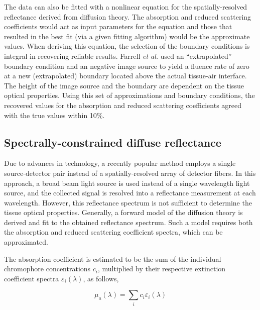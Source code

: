 The data can also be fitted with a nonlinear equation for the spatially-resolved reflectance derived from diffusion theory. The absorption and reduced scattering coefficients would act as input parameters for the equation and those that resulted in the best fit (via a given fitting algorithm) would be the approximate values. When deriving this equation, the selection of the boundary conditions is integral in recovering reliable results. Farrell \emph{et al.}\cite{Farrell1992} used an ``extrapolated'' boundary condition and an negative image source to yield a fluence rate of zero at a new (extrapolated) boundary located above the actual tissue-air interface. The height of the image source and the boundary are dependent on the tissue optical properties. Using this set of approximations and boundary conditions, the recovered values for the absorption and reduced scattering coefficients agreed with the true values within 10\%.


\subsection{Spectrally-constrained diffuse reflectance}
\label{spec_diff_refl}
Due to advances in technology, a recently popular method employs a single source-detector pair instead of a spatially-resolved array of detector fibers. In this approach, a broad beam light source is used instead of a single wavelength light source, and the collected signal is resolved into a reflectance measurement at each wavelength. However, this reflectance spectrum is not sufficient to determine the tissue optical properties. Generally, a forward model of the diffusion theory is derived and fit to the obtained reflectance spectrum. Such a model requires both the absorption and reduced scattering coefficient spectra, which can be approximated.

The absorption coefficient is estimated to be the sum of the individual chromophore concentrations $c_i$, multiplied by their respective extinction coefficient spectra $\varepsilon_i(\lambda)$, as follows,

\begin{equation}
\mu_a(\lambda) = \sum_i c_i \varepsilon_i(\lambda)
\end{equation}

